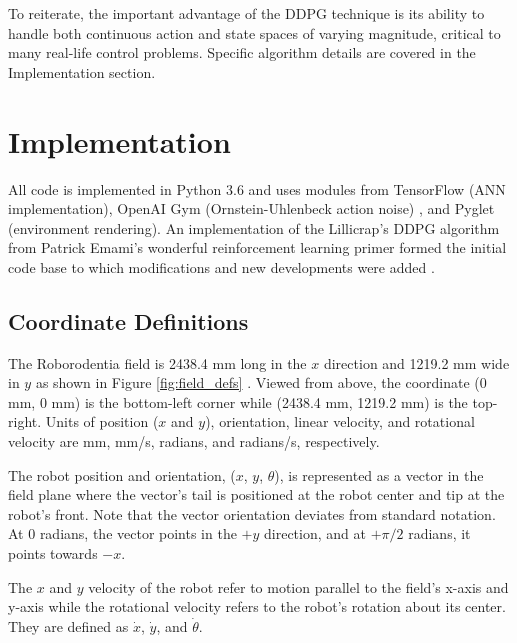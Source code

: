 To reiterate, the important advantage of the DDPG technique is its ability to handle both continuous action and state spaces of varying magnitude, critical to many real-life control problems. Specific algorithm details are covered in the Implementation section.

\section{Implementation}
All code is implemented in Python 3.6 and uses modules from TensorFlow \cite{tensorflow} (ANN implementation), OpenAI Gym (Ornstein-Uhlenbeck action noise) \cite{openaigym}, and Pyglet (environment rendering). An implementation of the Lillicrap's DDPG algorithm from Patrick Emami's wonderful reinforcement learning primer formed the initial code base to which modifications and new developments were added \cite{emami_2016}.


\subsection{Coordinate Definitions}
The Roborodentia field is 2438.4 mm long in the $x$ direction and 1219.2 mm wide in $y$ as shown in Figure \ref{fig:field_defs} \cite{roborodentia}. Viewed from above, the coordinate (0 mm, 0 mm) is the bottom-left corner while (2438.4 mm, 1219.2 mm) is the top-right. Units of position ($x$ and $y$), orientation, linear velocity, and rotational velocity are mm, mm/s, radians, and radians/s, respectively.

The robot position and orientation, ($x$, $y$, $\theta$), is represented as a vector in the field plane where the vector's tail is positioned at the robot center and tip at the robot's front. Note that the vector orientation deviates from standard notation. At 0 radians, the vector points in the $+y$ direction, and at $+\pi/2$ radians, it points towards $-x$. 

The $x$ and $y$ velocity of the robot refer to motion parallel to the field's x-axis and y-axis while the rotational velocity refers to the robot's rotation about its center. They are defined as $\dot{x}$, $\dot{y}$, and $\dot{\theta}$. 

